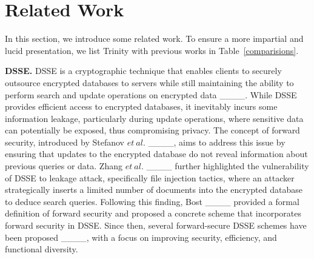 \section{Related Work}
In this section, we introduce some related work. To ensure a more impartial and lucid presentation, we list Trinity with previous works in Table~\ref{comparisions}.
\par  \textbf{DSSE.} DSSE is a cryptographic technique that enables clients to securely outsource encrypted databases to servers while still maintaining the ability to perform search and update operations on encrypted data ____. While DSSE provides efficient access to encrypted databases, it inevitably incurs some information leakage, particularly during update operations, where sensitive data can potentially be exposed, thus compromising privacy. The concept of forward security, introduced by Stefanov $et\ al.$ ____, aims to address this issue by ensuring that updates to the encrypted database do not reveal information about previous queries or data. Zhang $et\ al.$ ____ further highlighted the vulnerability of DSSE to leakage attack, specifically file injection tactics, where an attacker strategically inserts a limited number of documents into the encrypted database to deduce search queries. Following this finding, Bost ____ provided a formal definition of forward security and proposed a concrete scheme that incorporates forward security in DSSE. Since then, several forward-secure DSSE schemes have been proposed ____, with a focus on improving security, efficiency, and functional diversity.




